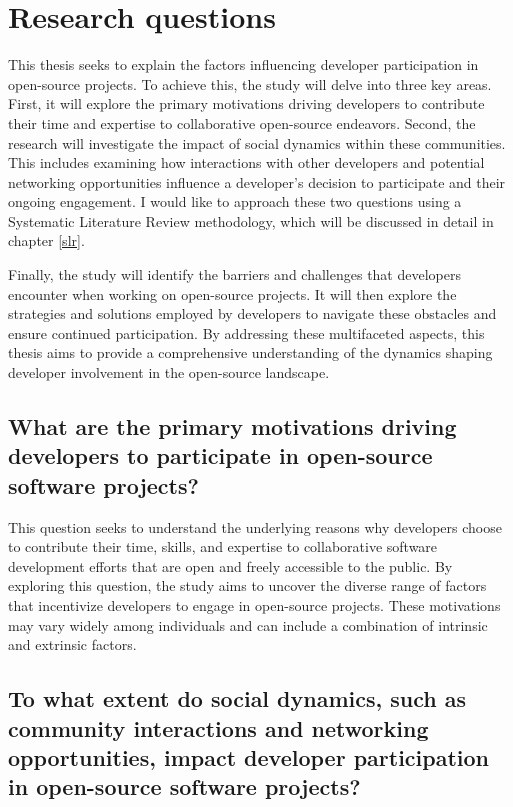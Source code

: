 \section{Research questions} \label{researchQuestions}
This thesis seeks to explain the factors influencing developer participation in open-source projects. To achieve this, the study will delve into three key areas. First, it will explore the primary motivations driving developers to contribute their time and expertise to collaborative open-source endeavors.  Second, the research will investigate the impact of social dynamics within these communities. This includes examining how interactions with other developers and potential networking opportunities influence a developer's decision to participate and their ongoing engagement. I would like to approach these two questions using a Systematic Literature Review methodology, which will be discussed in detail in chapter \ref{slr}.

Finally, the study will identify the barriers and challenges that developers encounter when working on open-source projects. It will then explore the strategies and solutions employed by developers to navigate these obstacles and ensure continued participation. By addressing these multifaceted aspects, this thesis aims to provide a comprehensive understanding of the dynamics shaping developer involvement in the open-source landscape.


\subsection{What are the primary motivations driving developers to participate in open-source software projects?}

This question seeks to understand the underlying reasons why developers choose to contribute their time, skills, and expertise to collaborative software development efforts that are open and freely accessible to the public. By exploring this question, the study aims to uncover the diverse range of factors that incentivize developers to engage in open-source projects. These motivations may vary widely among individuals and can include a combination of intrinsic and extrinsic factors.

\subsection{To what extent do social dynamics, such as community interactions and networking opportunities, impact developer participation in open-source software projects?}

